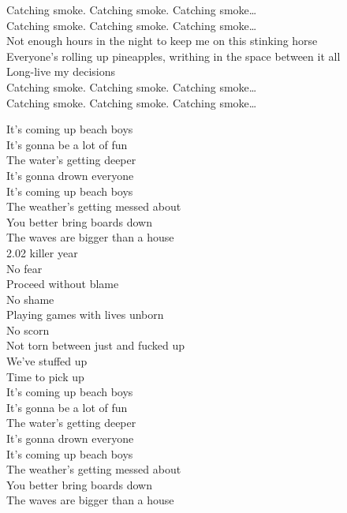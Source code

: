 Catching smoke. Catching smoke. Catching smoke… \\
Catching smoke. Catching smoke. Catching smoke… \\

Not enough hours in the night to keep me on this stinking horse \\
Everyone's rolling up pineapples, writhing in the space between it all \\
Long-live my decisions \\

Catching smoke. Catching smoke. Catching smoke… \\
Catching smoke. Catching smoke. Catching smoke… \\




It's coming up beach boys \\
It's gonna be a lot of fun \\
The water's getting deeper \\
It's gonna drown everyone \\
It's coming up beach boys \\
The weather's getting messed about \\
You better bring boards down \\
The waves are bigger than a house \\

2.02 killer year \\
No fear \\
Proceed without blame \\
No shame \\
Playing games with lives unborn \\
No scorn \\
Not torn between just and fucked up \\
We've stuffed up \\
Time to pick up \\

It's coming up beach boys \\
It's gonna be a lot of fun \\
The water's getting deeper \\
It's gonna drown everyone \\
It's coming up beach boys \\
The weather's getting messed about \\
You better bring boards down \\
The waves are bigger than a house \\

